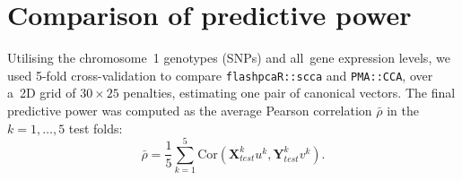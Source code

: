 \documentclass[a4paper,12pt]{article}
\begin{document}
\section{Comparison of predictive power}

Utilising the chromosome~1 genotypes (\nsnpschr SNPs) and all~\ngenes gene
expression levels, we used 5-fold cross-validation to compare
\texttt{flashpcaR::scca} and \texttt{PMA::CCA}, over a~2D grid of $30\times25$
penalties, estimating one pair of canonical vectors. The final predictive power
was computed as the average Pearson correlation
$\bar{\rho}$ in the~$k=1,\hdots,5$ test folds:
$$
\bar{\rho} = \frac{1}{5} \sum_{k=1}^5
   \mbox{Cor}(\mathbf{X}_{test}^k u^k, \mathbf{Y}_{test}^k v^k).
$$



\end{document}
